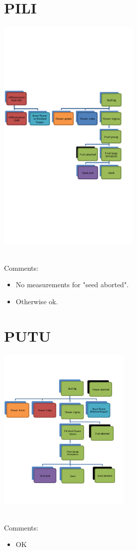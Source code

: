 \documentclass[10pt]{book} %
\begin{document}
\section{PILI}
\begin{multicols}{2}
\includegraphics[width=2.7in]{PILI.png}
\vfill
\columnbreak

\\Comments:
\begin{itemize}
\item No measurements for "seed aborted".
\item Otherwise ok.
\end{itemize}
\end{multicols}





\clearpage
\newpage
\section{PUTU}
\begin{multicols}{2}
\includegraphics[width=2.5in]{PUTU.png}
\vfill
\columnbreak

\\Comments:
\begin{itemize}
\item OK
\end{itemize}
\end{multicols}
\end{document}
